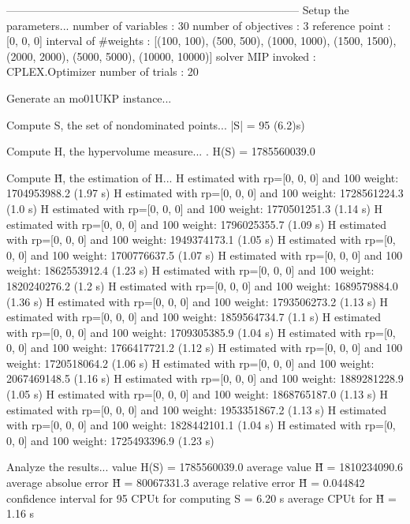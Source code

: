 --------------------------------------------------------------------------------
Setup the parameters...
  number of variables  : 30
  number of objectives : 3
  reference point      : [0, 0, 0]
  interval of #weights : [(100, 100), (500, 500), (1000, 1000), (1500, 1500), (2000, 2000), (5000, 5000), (10000, 10000)]
  solver MIP invoked   : CPLEX.Optimizer
  number of trials     : 20

Generate an mo01UKP instance...

Compute S, the set of nondominated points...
  |S|  = 95 (6.2)s)

Compute H, the hypervolume measure...
. H(S) = 1785560039.0

Compute H̃, the estimation of H...
  H estimated with rp=[0, 0, 0] and 100 weight:  1704953988.2  (1.97 s)
  H estimated with rp=[0, 0, 0] and 100 weight:  1728561224.3  (1.0 s)
  H estimated with rp=[0, 0, 0] and 100 weight:  1770501251.3  (1.14 s)
  H estimated with rp=[0, 0, 0] and 100 weight:  1796025355.7  (1.09 s)
  H estimated with rp=[0, 0, 0] and 100 weight:  1949374173.1  (1.05 s)
  H estimated with rp=[0, 0, 0] and 100 weight:  1700776637.5  (1.07 s)
  H estimated with rp=[0, 0, 0] and 100 weight:  1862553912.4  (1.23 s)
  H estimated with rp=[0, 0, 0] and 100 weight:  1820240276.2  (1.2 s)
  H estimated with rp=[0, 0, 0] and 100 weight:  1689579884.0  (1.36 s)
  H estimated with rp=[0, 0, 0] and 100 weight:  1793506273.2  (1.13 s)
  H estimated with rp=[0, 0, 0] and 100 weight:  1859564734.7  (1.1 s)
  H estimated with rp=[0, 0, 0] and 100 weight:  1709305385.9  (1.04 s)
  H estimated with rp=[0, 0, 0] and 100 weight:  1766417721.2  (1.12 s)
  H estimated with rp=[0, 0, 0] and 100 weight:  1720518064.2  (1.06 s)
  H estimated with rp=[0, 0, 0] and 100 weight:  2067469148.5  (1.16 s)
  H estimated with rp=[0, 0, 0] and 100 weight:  1889281228.9  (1.05 s)
  H estimated with rp=[0, 0, 0] and 100 weight:  1868765187.0  (1.13 s)
  H estimated with rp=[0, 0, 0] and 100 weight:  1953351867.2  (1.13 s)
  H estimated with rp=[0, 0, 0] and 100 weight:  1828442101.1  (1.04 s)
  H estimated with rp=[0, 0, 0] and 100 weight:  1725493396.9  (1.23 s)

Analyze the results...
  value H(S)                  = 1785560039.0 
  average value H̃             = 1810234090.6 
  average absolue error H̃     = 80067331.3 
  average relative error H̃    = 0.044842 
  confidence interval for 95%
  CPUt for computing S         = 6.20 s
  average CPUt for H̃           = 1.16 s

